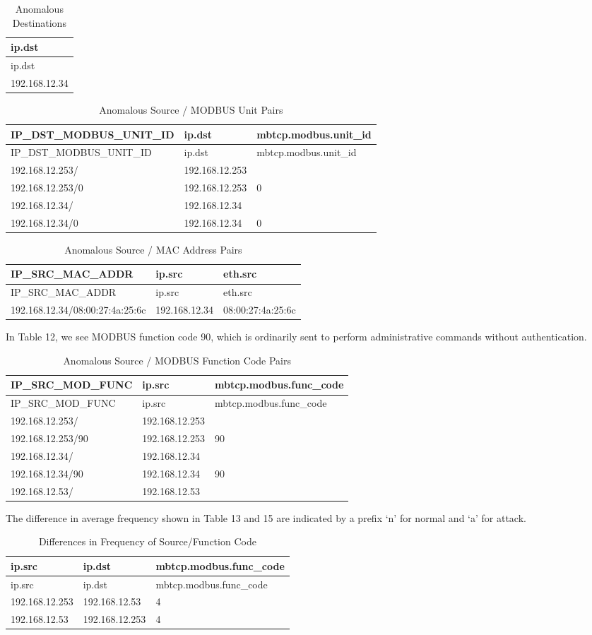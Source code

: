 \documentclass[11pt,a4paper]{article}
\begin{document}
\begin{longtable}[c]{@{}l@{}}
\caption{Anomalous Destinations}\tabularnewline
\toprule
ip.dst\tabularnewline
\midrule
\endfirsthead
\toprule
ip.dst\tabularnewline
\midrule
\endhead
192.168.12.34\tabularnewline
\bottomrule
\end{longtable}

\begin{longtable}[c]{@{}lll@{}}
\caption{Anomalous Source / MODBUS Unit Pairs}\tabularnewline
\toprule
IP\_DST\_MODBUS\_UNIT\_ID & ip.dst &
mbtcp.modbus.unit\_id\tabularnewline
\midrule
\endfirsthead
\toprule
IP\_DST\_MODBUS\_UNIT\_ID & ip.dst &
mbtcp.modbus.unit\_id\tabularnewline
\midrule
\endhead
192.168.12.253/ & 192.168.12.253 &\tabularnewline
192.168.12.253/0 & 192.168.12.253 & 0\tabularnewline
192.168.12.34/ & 192.168.12.34 &\tabularnewline
192.168.12.34/0 & 192.168.12.34 & 0\tabularnewline
\bottomrule
\end{longtable}

\begin{longtable}[c]{@{}lll@{}}
\caption{Anomalous Source / MAC Address Pairs}\tabularnewline
\toprule
IP\_SRC\_MAC\_ADDR & ip.src & eth.src\tabularnewline
\midrule
\endfirsthead
\toprule
IP\_SRC\_MAC\_ADDR & ip.src & eth.src\tabularnewline
\midrule
\endhead
192.168.12.34/08:00:27:4a:25:6c & 192.168.12.34 &
08:00:27:4a:25:6c\tabularnewline
\bottomrule
\end{longtable}

In Table 12, we see MODBUS function code 90, which is ordinarily sent to
perform administrative commands without authentication.

\begin{longtable}[c]{@{}lll@{}}
\caption{Anomalous Source / MODBUS Function Code Pairs}\tabularnewline
\toprule
IP\_SRC\_MOD\_FUNC & ip.src & mbtcp.modbus.func\_code\tabularnewline
\midrule
\endfirsthead
\toprule
IP\_SRC\_MOD\_FUNC & ip.src & mbtcp.modbus.func\_code\tabularnewline
\midrule
\endhead
192.168.12.253/ & 192.168.12.253 &\tabularnewline
192.168.12.253/90 & 192.168.12.253 & 90\tabularnewline
192.168.12.34/ & 192.168.12.34 &\tabularnewline
192.168.12.34/90 & 192.168.12.34 & 90\tabularnewline
192.168.12.53/ & 192.168.12.53 &\tabularnewline
\bottomrule
\end{longtable}

The difference in average frequency shown in Table 13 and 15 are
indicated by a prefix `n' for normal and `a' for attack.

\begin{longtable}[c]{@{}lll@{}}
\caption{Differences in Frequency of Source/Function
Code}\tabularnewline
\toprule
ip.src & ip.dst & mbtcp.modbus.func\_code\tabularnewline
\midrule
\endfirsthead
\toprule
ip.src & ip.dst & mbtcp.modbus.func\_code\tabularnewline
\midrule
\endhead
192.168.12.253 & 192.168.12.53 & 4\tabularnewline
192.168.12.53 & 192.168.12.253 & 4\tabularnewline
\bottomrule
\end{longtable}
\end{document}
